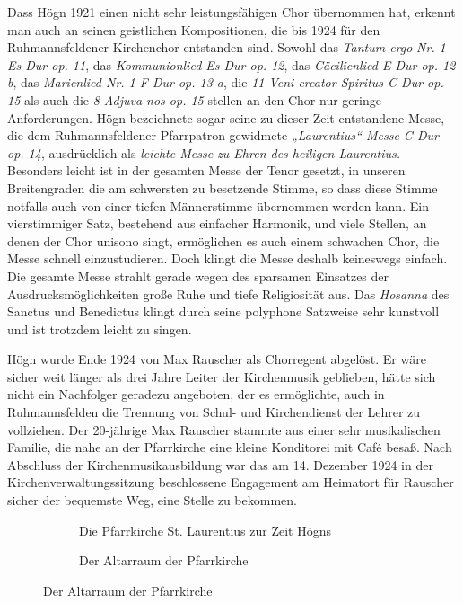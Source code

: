 Dass Högn 1921 einen nicht sehr leistungsfähigen Chor übernommen hat,
erkennt man auch an seinen geistlichen Kompositionen, die bis 1924 für
den Ruhmannsfeldener Kirchenchor entstanden sind. Sowohl das
\textit{Tantum ergo} \textit{Nr.} \textit{1 Es-Dur op. 11}, das
\textit{Kommunionlied Es-Dur op. 12}, das \textit{Cäcilienlied E-Dur
op. 12 b}, das \textit{Marienlied Nr. 1 F-Dur op. 13 a}, die \textit{11
Veni creator Spiritus C-Dur op. 15} als auch die \textit{8 Adjuva nos
op. 15} stellen an den Chor nur geringe Anforderungen. Högn bezeichnete
sogar seine zu dieser Zeit entstandene Messe, die dem
Ruhmannsfeldener Pfarrpatron gewidmete \textit{„Laurentius“-Messe
C-Dur op. 14}, ausdrücklich als \textit{leichte Messe zu Ehren des
heiligen Laurentius.} Besonders leicht ist in der gesamten Messe der
Tenor gesetzt, in unseren Breitengraden die am schwersten zu besetzende
Stimme, so dass diese Stimme notfalls auch von einer tiefen
Männerstimme übernommen werden kann. Ein vierstimmiger Satz, bestehend
aus einfacher Harmonik, und viele Stellen, an denen der Chor unisono
singt, ermöglichen es auch einem schwachen Chor, die Messe schnell
einzustudieren. Doch klingt die Messe deshalb keineswegs einfach. Die
gesamte Messe strahlt gerade wegen des sparsamen Einsatzes der
Ausdrucksmöglichkeiten große Ruhe und tiefe Religiosität aus. Das
\textit{Hosanna} des Sanctus und Benedictus klingt durch seine
polyphone Satzweise sehr kunstvoll und ist trotzdem leicht zu singen.

Högn wurde Ende 1924 von Max Rauscher als Chorregent abgelöst. Er wäre
sicher weit länger als drei Jahre Leiter der Kirchenmusik geblieben,
hätte sich nicht ein Nachfolger geradezu angeboten, der es ermöglichte,
auch in Ruhmannsfelden die Trennung von Schul- und Kirchendienst der
Lehrer zu vollziehen. Der 20-jährige Max Rauscher stammte aus einer
sehr musikalischen Familie, die nahe an der Pfarrkirche eine kleine
Konditorei mit Café besaß. Nach Abschluss der Kirchenmusikausbildung
war das am 14. Dezember 1924 in der Kirchenverwaltungssitzung
beschlossene Engagement am Heimatort für Rauscher sicher der bequemste
Weg, eine Stelle zu bekommen.

\begin{figure}
\begin{subfigure}[b]{0.5\linewidth}
\caption{Die Pfarrkirche St. Laurentius zur Zeit Högns}
\end{subfigure}
\begin{subfigure}[b]{0.5\linewidth}
\caption{Der Altarraum der Pfarrkirche}
\end{subfigure}
\end{figure}

